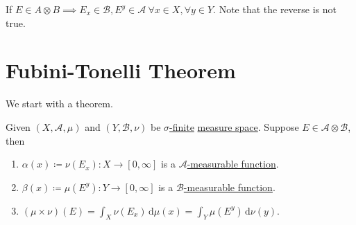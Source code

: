 \begin{prev}
	If \(E\in A\otimes B\implies E_{x} \in \mathcal{B} , E^y\in \mathcal{A}\ \forall x\in X, \forall y\in Y\).
	Note that the reverse is not true.
\end{prev}

\section{Fubini-Tonelli Theorem}
We start with a theorem.

\begin{theorem}\label{thm:Tonelli-for-characteristic-functions}
	Given \((X, \mathcal{A} , \mu )\) and \((Y, \mathcal{B} , \nu )\) be \hyperref[def:sigma-finite-measure]{\(\sigma\)-finite}
	\hyperref[def:measure-space]{measure space}. Suppose \(E\in \mathcal{A} \otimes \mathcal{B} \), then
	\begin{enumerate}[(1)]
		\item \(\alpha (x)\coloneqq \nu (E_x)\colon X\to [0, \infty ]\) is a \hyperref[def:A-measurable-function]{\(\mathcal{A}\)-measurable function}.
		\item \(\beta (x)\coloneqq \mu (E^y)\colon Y\to [0, \infty ]\) is a \hyperref[def:A-measurable-function]{\(\mathcal{B}\)-measurable function}.
		\item \((\mu \times \nu) (E) = \int_X \nu (E_x)\,\mathrm{d} \mu(x) = \int _Y \mu (E^y)\,\mathrm{d} \nu (y)\).
	\end{enumerate}
\end{theorem}
